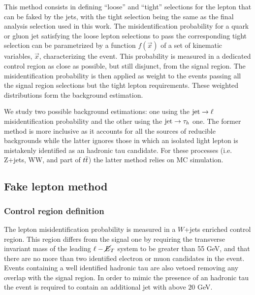 This method consists in defining ``loose'' and ``tight'' selections for the lepton that can be faked by the jets, with the tight selection being the same as the final analysis selection used in this work.
The misidentification probability for a quark or gluon jet satisfying the loose lepton selections to pass the corresponding tight selection can be parametrized by a function $f(\vec{x})$ of a set of kinematic variables, $\vec{x}$, characterizing the event. This probability is measured in a dedicated control region as close as possible, but still disjunct, from the signal region. The misidentification probability is then applied as weight to the events passing all the signal region selections but the tight lepton requirements. These weighted distributions form the background estimation.

We study two possible background estimations: one using the $\mathrm{jet} \rightarrow \ell$ misidentification probability and the other using the $\mathrm{jet} \rightarrow \tau_h$ one. The former method is more inclusive as it accounts for all the sources of reducible backgrounds while the latter ignores those in which an isolated light lepton is mistakenly identified as an hadronic tau candidate. For these processes (i.e. Z+jets, WW, and part of $t\overline{t}$) the latter method relies on MC simulation. 

\subsection{Fake lepton method}
\label{sec:fakemethod}
\subsubsection{Control region definition}
The lepton misidentification probability is measured in a $W$+jets enriched control region.
This region differs from the signal one by requiring the transverse invariant mass of the leading $\ell-\cancel{E}_T$ system to be greater than 55 GeV,
and that there are no more than two identified electron or muon candidates in the event. Events containing a well identified hadronic tau are also vetoed removing any overlap with the signal region. In order to mimic the presence of an hadronic tau the event is required to contain an additional jet with \pT above $20$ GeV.

